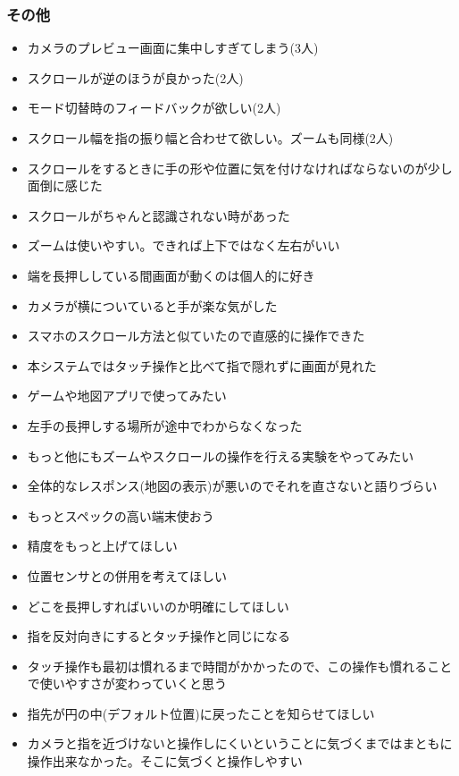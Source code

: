 \documentclass[11pt,a4j, titlepage]{jarticle} %
\begin{document}
\subsubsection{その他}

\begin{itemize}
	\item カメラのプレビュー画面に集中しすぎてしまう(3人)
	\item スクロールが逆のほうが良かった(2人)
	\item モード切替時のフィードバックが欲しい(2人)
	\item スクロール幅を指の振り幅と合わせて欲しい。ズームも同様(2人)
	\item スクロールをするときに手の形や位置に気を付けなければならないのが少し面倒に感じた
	\item スクロールがちゃんと認識されない時があった
	\item ズームは使いやすい。できれば上下ではなく左右がいい
	\item 端を長押ししている間画面が動くのは個人的に好き
	\item カメラが横についていると手が楽な気がした
	\item スマホのスクロール方法と似ていたので直感的に操作できた
	\item 本システムではタッチ操作と比べて指で隠れずに画面が見れた
	\item ゲームや地図アプリで使ってみたい
	\item 左手の長押しする場所が途中でわからなくなった
	\item もっと他にもズームやスクロールの操作を行える実験をやってみたい
	\item 全体的なレスポンス(地図の表示)が悪いのでそれを直さないと語りづらい
	\item もっとスペックの高い端末使おう
	\item 精度をもっと上げてほしい
	\item 位置センサとの併用を考えてほしい
	\item どこを長押しすればいいのか明確にしてほしい
	\item 指を反対向きにするとタッチ操作と同じになる
	\item タッチ操作も最初は慣れるまで時間がかかったので、この操作も慣れることで使いやすさが変わっていくと思う
	\item 指先が円の中(デフォルト位置)に戻ったことを知らせてほしい
	\item カメラと指を近づけないと操作しにくいということに気づくまではまともに操作出来なかった。そこに気づくと操作しやすい
\end{itemize}
\end{document}
